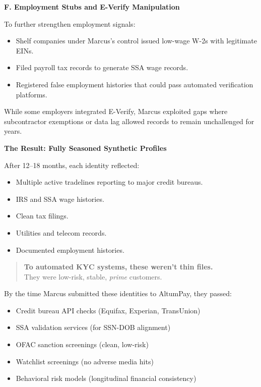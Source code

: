\medskip

\textbf{F. Employment Stubs and E-Verify Manipulation}

To further strengthen employment signals:

\begin{itemize}
    \item Shelf companies under Marcus’s control issued low-wage W-2s with legitimate EINs.
    \item Filed payroll tax records to generate SSA wage records.
    \item Registered false employment histories that could pass automated verification platforms.
\end{itemize}

While some employers integrated E-Verify, Marcus exploited gaps where subcontractor exemptions or data lag allowed records to remain unchallenged for years.

\medskip

\textbf{The Result: Fully Seasoned Synthetic Profiles}

After 12--18 months, each identity reflected:

\begin{itemize}
    \item Multiple active tradelines reporting to major credit bureaus.
    \item IRS and SSA wage histories.
    \item Clean tax filings.
    \item Utilities and telecom records.
    \item Documented employment histories.
\end{itemize}

\begin{quote}
\textbf{To automated KYC systems, these weren’t thin files.} \\
They were low-risk, stable, \emph{prime} customers.
\end{quote}

By the time Marcus submitted these identities to AltumPay, they passed:

\begin{itemize}
    \item Credit bureau API checks (Equifax, Experian, TransUnion)
    \item SSA validation services (for SSN-DOB alignment)
    \item OFAC sanction screenings (clean, low-risk)
    \item Watchlist screenings (no adverse media hits)
    \item Behavioral risk models (longitudinal financial consistency)
\end{itemize}


